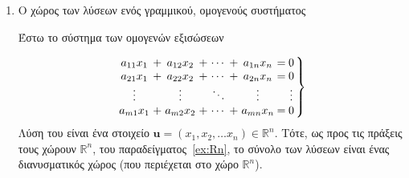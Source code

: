 \begin{examples}
\begin{enumerate}
        \item \textcolor{Col2}{Ο χώρος των λύσεων ενός γραμμικού, ομογενούς 
            συστήματος}

            Έστω το σύστημα των ομογενών εξισώσεων

            \begin{equation}
                \setlength\arraycolsep{1.5pt} %
                \left.
                    \begin{array}{ccc ccc c @{\extracolsep{2.5pt}}c
                        @{\extracolsep{2.5pt}}c}
                        a_{11}x_{1} & + & a_{12}x_{2} & + & \cdots & + & a_{1n}x_{n} & =
                                    & 0 \\
                        a_{21}x_{1} & + & a_{22}x_{2} & + & \cdots & + & a_{2n}x_{n} & =
                                    & 0 \\
                        \vdots & & \vdots & & \ddots & &  \vdots & &  \vdots \\
                        a_{m1}x_{1} & + & a_{m2}x_{2} & + & \cdots & + & a_{mn}x_{n} & =
                                    & 0 \\
                    \end{array}
                \right\}
            \end{equation}
            Λύση του είναι ένα στοιχείο $ \mathbf{u} = (x_{1}, x_{2}, \ldots x_{n}) 
            \in \mathbb{R}^{n} $.  Τότε, ως προς τις πράξεις τους χώρουν 
            $ \mathbb{R}^{n} $, του παραδείγματος~\ref{ex:Rn}, το σύνολο των 
            λύσεων είναι ένας διανυσματικός χώρος (που περιέχεται στο χώρο 
            $ \mathbb{R}^{n} $).
    \end{enumerate}
\end{examples}


